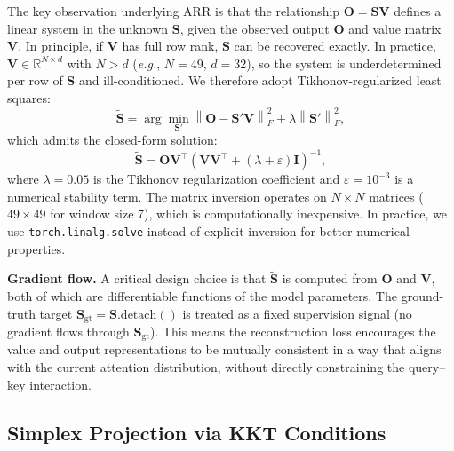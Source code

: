 \documentclass[review,12pt,authoryear]{elsarticle}
\newcommand{\method}{ARR}
\begin{document}
The key observation underlying \method{} is that the relationship $\mathbf{O} = \mathbf{S}\mathbf{V}$ defines a linear system in the unknown $\mathbf{S}$, given the observed output $\mathbf{O}$ and value matrix $\mathbf{V}$.
In principle, if $\mathbf{V}$ has full row rank, $\mathbf{S}$ can be recovered exactly.
In practice, $\mathbf{V} \in \mathbb{R}^{N \times d}$ with $N > d$ (\emph{e.g.}, $N = 49$, $d = 32$), so the system is underdetermined per row of $\mathbf{S}$ and ill-conditioned.
We therefore adopt Tikhonov-regularized least squares:
\begin{equation}
    \tilde{\mathbf{S}} = \arg\min_{\mathbf{S}'} \left\| \mathbf{O} - \mathbf{S}'\mathbf{V} \right\|_F^2 + \lambda \left\| \mathbf{S}' \right\|_F^2,
    \label{eq:tikhonov}
\end{equation}
which admits the closed-form solution:
\begin{equation}
    \tilde{\mathbf{S}} = \mathbf{O}\mathbf{V}^\top \left(\mathbf{V}\mathbf{V}^\top + (\lambda + \varepsilon)\mathbf{I}\right)^{-1},
    \label{eq:solve_S}
\end{equation}
where $\lambda = 0.05$ is the Tikhonov regularization coefficient and $\varepsilon = 10^{-3}$ is a numerical stability term.
The matrix inversion operates on $N \times N$ matrices ($49 \times 49$ for window size 7), which is computationally inexpensive.
In practice, we use \texttt{torch.linalg.solve} instead of explicit inversion for better numerical properties.

\textbf{Gradient flow.}
A critical design choice is that $\tilde{\mathbf{S}}$ is computed from $\mathbf{O}$ and $\mathbf{V}$, both of which are differentiable functions of the model parameters.
The ground-truth target $\mathbf{S}_{\text{gt}} = \mathbf{S}.\text{detach}()$ is treated as a fixed supervision signal (no gradient flows through $\mathbf{S}_{\text{gt}}$).
This means the reconstruction loss encourages the value and output representations to be mutually consistent in a way that aligns with the current attention distribution, without directly constraining the query--key interaction.

\subsection{Simplex Projection via KKT Conditions}
\label{sec:method:simplex}
\end{document}
